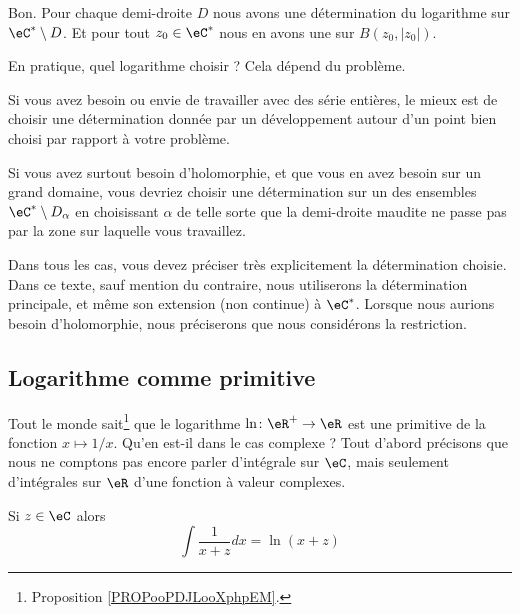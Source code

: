 Bon. Pour chaque demi-droite \( D\) nous avons une détermination du logarithme sur \( \eC^*\setminus D\). Et pour tout \( z_0\in \eC^*\) nous en avons une sur \( B(z_0,| z_0 |)\).

En pratique, quel logarithme choisir ? Cela dépend du problème.

Si vous avez besoin ou envie de travailler avec des série entières, le mieux est de choisir une détermination donnée par un développement autour d'un point bien choisi par rapport à votre problème.

Si vous avez surtout besoin d'holomorphie, et que vous en avez besoin sur un grand domaine, vous devriez choisir une détermination sur un des ensembles \( \eC^*\setminus D_{\alpha}\) en choisissant \( \alpha\) de telle sorte que la demi-droite maudite ne passe pas par la zone sur laquelle vous travaillez.

Dans tous les cas, vous devez préciser très explicitement la détermination choisie. Dans ce texte, sauf mention du contraire, nous utiliserons la détermination principale, et même son extension (non continue) à \( \eC^*\). Lorsque nous aurions besoin d'holomorphie, nous préciserons que nous considérons la restriction.

\subsection{Logarithme comme primitive}

Tout le monde sait\footnote{Proposition \ref{PROPooPDJLooXphpEM}.} que le logarithme \( \ln\colon \eR^+\to \eR\) est une primitive de la fonction \( x\mapsto 1/x\). Qu'en est-il dans le cas complexe ? Tout d'abord précisons que nous ne comptons pas encore parler d'intégrale sur \( \eC\), mais seulement d'intégrales sur \( \eR\) d'une fonction à valeur complexes.

\begin{proposition}     \label{PROPooNIJVooKueuYJ}
	Si \( z\in \eC\) alors
	\begin{equation}        \label{EQooAHYXooTPGXDS}
		\int\frac{1}{ x+z }dx=\ln(x+z)
	\end{equation}
\end{proposition}

